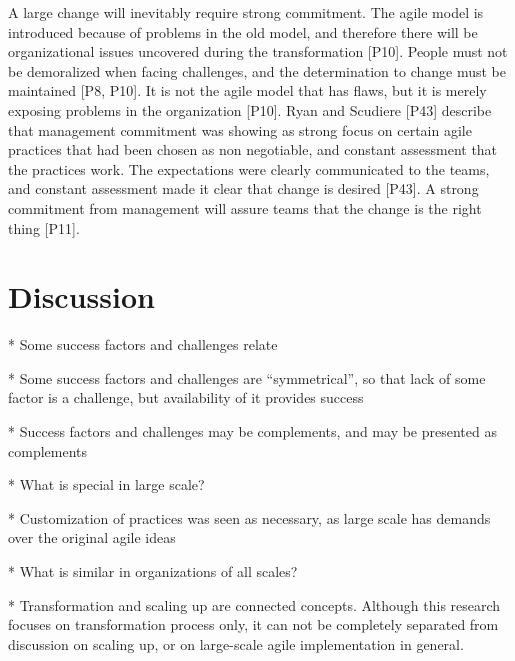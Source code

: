\documentclass[preprint,authoryear,12pt]{elsarticle}
\begin{document}

A large change will inevitably require strong commitment. The agile model is
introduced because of problems in the old model, and therefore there will be
organizational issues uncovered during the transformation [P10]. People must not
be demoralized when facing challenges, and the determination to change must be
maintained [P8, P10]. It is not the agile model that has flaws, but it is
merely exposing problems in the organization [P10].
Ryan and Scudiere [P43] describe that management commitment was showing as
strong focus on certain agile practices that had been chosen as non negotiable,
and constant assessment that the practices work. The expectations were clearly
communicated to the teams, and constant assessment made it clear that change is
desired [P43].
A strong commitment from management will assure teams that the change is the
right thing [P11].














\section{Discussion}
\label{sec:discussion}

* Some success factors and challenges relate

* Some success factors and challenges are ``symmetrical'', so that lack of some
  factor is a challenge, but availability of it provides success

* Success factors and challenges may be complements, and may be presented as
  complements

* What is special in large scale?

* Customization of practices was seen as necessary, as large scale has demands
  over the original agile ideas

* What is similar in organizations of all scales?

* Transformation and scaling up are connected concepts. Although this research
  focuses on transformation process only, it can not be completely separated
  from discussion on scaling up, or on large-scale agile implementation in
  general.
\end{document}
